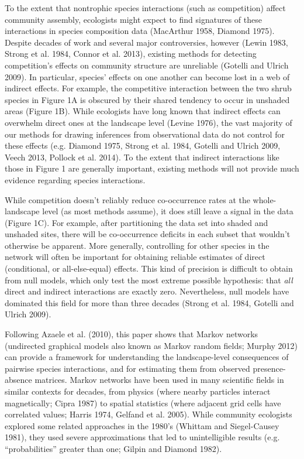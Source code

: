 \documentclass[12pt,]{article}
\begin{document}
\begin{spacing}{1.9}
\begin{flushleft}
\noindent
To the extent that nontrophic species interactions (such as competition)
affect community assembly, ecologists might expect to find signatures of
these interactions in species composition data (MacArthur 1958, Diamond
1975). Despite decades of work and several major controversies, however
(Lewin 1983, Strong et al. 1984, Connor et al. 2013), existing methods
for detecting competition's effects on community structure are
unreliable (Gotelli and Ulrich 2009). In particular, species' effects on
one another can become lost in a web of indirect effects. For example,
the competitive interaction between the two shrub species in Figure 1A
is obscured by their shared tendency to occur in unshaded areas (Figure
1B). While ecologists have long known that indirect effects can
overwhelm direct ones at the landscape level (Levine 1976), the vast
majority of our methods for drawing inferences from observational data
do not control for these effects (e.g. Diamond 1975, Strong et al. 1984,
Gotelli and Ulrich 2009, Veech 2013, Pollock et al. 2014). To the extent
that indirect interactions like those in Figure 1 are generally
important, existing methods will not provide much evidence regarding
species interactions.

While competition doesn't reliably reduce co-occurrence rates at the
whole-landscape level (as most methods assume), it does still leave a
signal in the data (Figure 1C). For example, after partitioning the data
set into shaded and unshaded sites, there will be co-occurrence deficits
in each subset that wouldn't otherwise be apparent. More generally,
controlling for other species in the network will often be important for
obtaining reliable estimates of direct (conditional, or all-else-equal)
effects. This kind of precision is difficult to obtain from null models,
which only test the most extreme possible hypothesis: that \emph{all}
direct and indirect interactions are exactly zero. Nevertheless, null
models have dominated this field for more than three decades (Strong et
al. 1984, Gotelli and Ulrich 2009).

Following Azaele et al. (2010), this paper shows that Markov networks
(undirected graphical models also known as Markov random fields; Murphy
2012) can provide a framework for understanding the landscape-level
consequences of pairwise species interactions, and for estimating them
from observed presence-absence matrices. Markov networks have been used
in many scientific fields in similar contexts for decades, from physics
(where nearby particles interact magnetically; Cipra 1987) to spatial
statistics (where adjacent grid cells have correlated values; Harris
1974, Gelfand et al. 2005). While community ecologists explored some
related approaches in the 1980's (Whittam and Siegel-Causey 1981), they
used severe approximations that led to unintelligible results (e.g.
``probabilities'' greater than one; Gilpin and Diamond 1982).


\end{flushleft}
\end{spacing}
\end{document}
